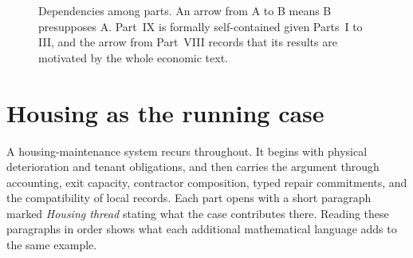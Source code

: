 \begin{figure}[ht]
\centering
{}
\caption{Dependencies among parts. An arrow from A to B means B presupposes A. Part~IX is formally self-contained given Parts~I to III, and the arrow from Part~VIII records that its results are motivated by the whole economic text.}
\label{fig:deps}
\end{figure}

\section*{Housing as the running case}

A housing-maintenance system recurs throughout. It begins with physical deterioration and tenant obligations, and then carries the argument through accounting, exit capacity, contractor composition, typed repair commitments, and the compatibility of local records. Each part opens with a short paragraph marked \emph{Housing thread} stating what the case contributes there. Reading these paragraphs in order shows what each additional mathematical language adds to the same example.
